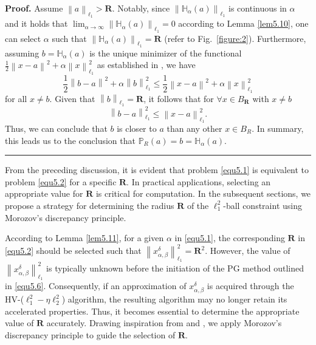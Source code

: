 \documentclass[a4paper,12pt]{article}
\numberwithin{equation}{section}
\newenvironment{proof}[1][Proof]{\textbf{#1.} }
{\ \rule{0.75em}{0.75em}\smallskip}
\begin{document}
\begin{proof}
    Assume $\left\|a\right\|_{\ell_{1}}>\mathbf{R}$. Notably, since $\left\|\mathbb{H}_{\alpha}\left(a\right)\right\|_{\ell_{1}}$ is continuous in $\alpha$ and it holds that $\lim_{\alpha\rightarrow \infty} \left\|\mathbb{H}_{\alpha}\left(a\right)\right\|_{\ell_{1}}=0$ according to Lemma \ref{lem5.10}, one can select $\alpha$ such that $\left\|\mathbb{H}_{\alpha}\left(a\right)\right\|_{\ell_{1}}=\mathbf{R}$ (refer to Fig.\ \ref{figure:2}). Furthermore, assuming $b=\mathbb{H}_{\alpha}\left(a\right)$ is the unique minimizer of the functional $\frac{1}{2}\left\|x-a\right\|^{2}+\alpha\left\|x\right\|_{\ell_{1}}^{2}$ as established in \cite{BA17}, we have
    \begin{equation*}
        \frac{1}{2}\left\|b-a\right\|^{2}+\alpha\left\|b\right\|_{\ell_{1}}^{2} \leq\frac{1}{2}\left\|x-a\right\|^{2}+\alpha\left\|x\right\|_{\ell_{1}}^{2}
    \end{equation*}
    for all $x\neq b$. Given that $\left\|b\right\|_{\ell_{1}}=\mathbf{R}$,  it follows that for $\forall x\in B_{\mathbf{R}}$ with $x\neq b$
    \begin{equation*}
        \left\|b-a\right\|_{\ell_{1}}^{2}\leq\left\|x-a\right\|_{\ell_{1}}^{2}.
    \end{equation*}
    Thus, we can conclude that $b$ is closer to $a$ than any other $x\in B_{R}$. In summary, this leads us to the conclusion that $\mathbb{P}_{R}\left(a\right)=b=\mathbb{H}_{\alpha}\left(a\right)$.
\end{proof}

\par From the preceding discussion, it is evident that problem \eqref{equ5.1} is equivalent to problem \eqref{equ5.2} for a specific $\mathbf{R}$. In practical applications, selecting an appropriate value for $\mathbf{R}$ is critical for computation. In the subsequent sections, we propose a strategy for determining the radius $\mathbf{R}$ of the $\ell_{1}^{2}$-ball constraint using Morozov's discrepancy principle.

\par According to Lemma \ref{lem5.11}, for a given $\alpha$ in \eqref{equ5.1}, the corresponding $\mathbf{R}$ in \eqref{equ5.2} should be selected such that $\left\|x_{\alpha,\beta}^{\delta}\right\|_{\ell_{1}}^{2}= \mathbf{R}^{2}$. However, the value of $\left\|x_{\alpha,\beta}^{\delta}\right\|_{\ell_{1}}^{2}$ is typically unknown before the initiation of the PG method outlined in \eqref{equ5.6}. Consequently, if an approximation of $x_{\alpha,\beta}^{\delta}$ is acquired through the HV-($\ell_{1}^{2}-\eta\ell_{2}^{2}$) algorithm, the resulting algorithm may no longer retain its accelerated properties. Thus, it becomes essential to determine the appropriate value of $\mathbf{R}$ accurately. Drawing inspiration from \cite{DH20} and \cite{DH23}, we apply Morozov's discrepancy principle to guide the selection of $\mathbf{R}$. 
\end{document}
